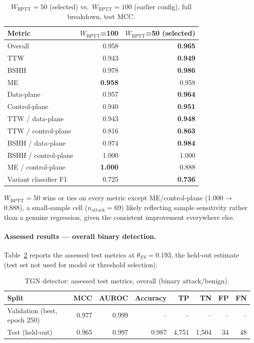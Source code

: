 \begin{table}[htbp]
\centering
\caption{$W_{\text{BPTT}}=50$ (selected) vs.\ $W_{\text{BPTT}}=100$ (earlier config), full breakdown, test MCC.}
\label{tab:tgn-val2-wbptt-compare}
\begin{tabular}{@{}lrr@{}}
\toprule
Metric & $W_{\text{BPTT}}$=100 & $W_{\text{BPTT}}$=50 (selected) \\
\midrule
Overall             & 0.958 & \textbf{0.965} \\
TTW                  & 0.943 & \textbf{0.949} \\
BSHH                 & 0.978 & \textbf{0.986} \\
ME                   & \textbf{0.958} & 0.958 \\
Data-plane           & 0.957 & \textbf{0.964} \\
Control-plane        & 0.940 & \textbf{0.951} \\
TTW / data-plane     & 0.943 & \textbf{0.948} \\
TTW / control-plane  & 0.816 & \textbf{0.863} \\
BSHH / data-plane    & 0.974 & \textbf{0.984} \\
BSHH / control-plane & 1.000 & 1.000 \\
ME / control-plane   & \textbf{1.000} & 0.888 \\
Variant classifier F1 & 0.725 & \textbf{0.736} \\
\bottomrule
\end{tabular}
\end{table}

$W_{\text{BPTT}}=50$ wins or ties on every metric except ME/control-plane
(1.000$\to$0.888), a small-sample cell ($n_{\text{attack}}=69$) likely
reflecting sample sensitivity rather than a genuine regression, given the
consistent improvement everywhere else.

\paragraph{Assessed results --- overall binary detection.}
Table~\ref{tab:tgn-val2-results} reports the assessed test metrics at
$\theta_{FS}=0.193$, the held-out estimate (test set not used for model
or threshold selection).

\begin{table}[htbp]
\centering
\caption{TGN detector: assessed test metrics, overall (binary attack/benign).}
\label{tab:tgn-val2-results}
\begin{tabular}{@{}lrrrrrrr@{}}
\toprule
Split & MCC & AUROC & Accuracy & TP & TN & FP & FN \\
\midrule
Validation (best, epoch 250) & 0.977 & 0.999 & --    & --    & --    & --  & -- \\
Test (held-out)               & 0.965 & 0.997 & 0.987 & 4{,}751 & 1{,}504 & 34 & 48 \\
\bottomrule
\end{tabular}
\end{table}

